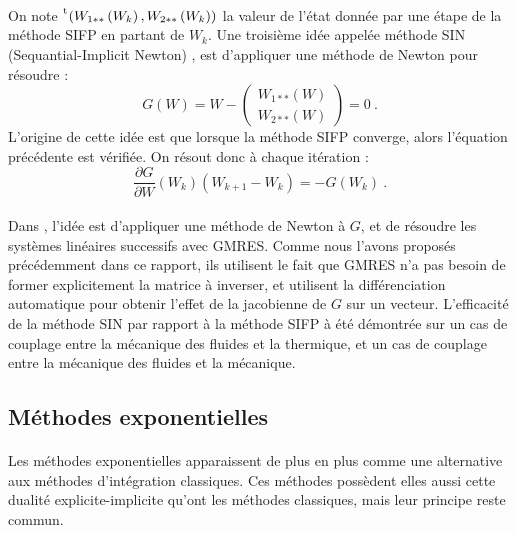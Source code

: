     \paragraph{}
    On note $\mskip1mu\prescript{\smash{\mathrm t\mkern-3mu}}{}{\mathstrut\left(W_{1**}\left(W_k\right), W_{2**}\left(W_k\right)\right)}$ la valeur de l'état donnée par une étape de la méthode SIFP en partant de $W_k$.
    Une troisième idée appelée méthode SIN (Sequantial-Implicit Newton) \cite{WongKwokHorneEtAl2019}, est d'appliquer une méthode de Newton pour résoudre :
    \[G\left(W\right) = W - \begin{pmatrix}W_{1**}\left(W\right) \\ W_{2**}\left(W\right)\end{pmatrix} = 0\ .\]
    L'origine de cette idée est que lorsque la méthode SIFP converge, alors l'équation précédente est vérifiée.
    On résout donc à chaque itération :
    \[\frac{\partial G}{\partial W}\left(W_k\right)\left(W_{k+1} - W_k\right) = -G\left(W_k\right)\ .\]

    \paragraph{}
    Dans \cite{WongKwokHorneEtAl2019}, l'idée est d'appliquer une méthode de Newton à $G$, et de résoudre les systèmes linéaires successifs avec GMRES.
    Comme nous l'avons proposés précédemment dans ce rapport, ils utilisent le fait que GMRES n'a pas besoin de former explicitement la matrice à inverser, et utilisent la différenciation automatique pour obtenir l'effet de la jacobienne de $G$ sur un vecteur.
    L'efficacité de la méthode SIN par rapport à la méthode SIFP à été démontrée sur un cas de couplage entre la mécanique des fluides et la thermique, et un cas de couplage entre la mécanique des fluides et la mécanique.


  \subsection{Méthodes exponentielles}

    \paragraph{}
    Les méthodes exponentielles apparaissent de plus en plus comme une alternative aux méthodes d'intégration classiques.
    Ces méthodes possèdent elles aussi cette dualité explicite-implicite qu'ont les méthodes classiques, mais leur principe reste commun.


